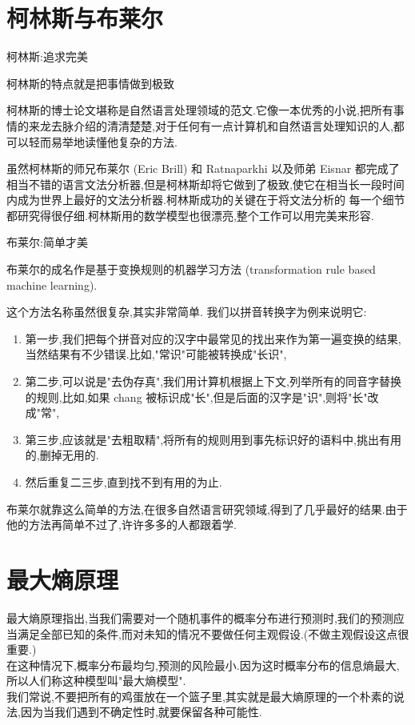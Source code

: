 \documentclass{article}
\begin{document}
\section{柯林斯与布莱尔}
柯林斯:追求完美

柯林斯的特点就是把事情做到极致

柯林斯的博士论文堪称是自然语言处理领域的范文.它像一本优秀的小说,把所有事情的来龙去脉介绍的清清楚楚,对于任何有一点计算机和自然语言处理知识的人,都可以轻而易举地读懂他复杂的方法.

虽然柯林斯的师兄布莱尔 (Eric Brill) 和 Ratnaparkhi 以及师弟 Eisnar 都完成了相当不错的语言文法分析器,但是柯林斯却将它做到了极致,使它在相当长一段时间内成为世界上最好的文法分析器.柯林斯成功的关键在于将文法分析的 每一个细节都研究得很仔细.柯林斯用的数学模型也很漂亮,整个工作可以用完美来形容.

\bigskip
布莱尔:简单才美

布莱尔的成名作是基于变换规则的机器学习方法 (transformation rule based machine learning).

这个方法名称虽然很复杂,其实非常简单. 我们以拼音转换字为例来说明它:
\begin{enumerate}
\item 第一步,我们把每个拼音对应的汉字中最常见的找出来作为第一遍变换的结果,当然结果有不少错误.比如,"常识"可能被转换成"长识", 
\item 第二步,可以说是"去伪存真",我们用计算机根据上下文,列举所有的同音字替换的规则,比如,如果 chang 被标识成"长",但是后面的汉字是"识",则将"长"改成"常", 
\item 第三步,应该就是"去粗取精",将所有的规则用到事先标识好的语料中,挑出有用的,删掉无用的.
\item 然后重复二三步,直到找不到有用的为止. 
\end{enumerate}

布莱尔就靠这么简单的方法,在很多自然语言研究领域,得到了几乎最好的结果.由于他的方法再简单不过了,许许多多的人都跟着学.

\section{最大熵原理}
最大熵原理指出,当我们需要对一个随机事件的概率分布进行预测时,我们的预测应当满足全部已知的条件,而对未知的情况不要做任何主观假设.(不做主观假设这点很重要.)\\
在这种情况下,概率分布最均匀,预测的风险最小.因为这时概率分布的信息熵最大,所以人们称这种模型叫"最大熵模型".\\
我们常说,不要把所有的鸡蛋放在一个篮子里,其实就是最大熵原理的一个朴素的说法,因为当我们遇到不确定性时,就要保留各种可能性.
\end{document}
